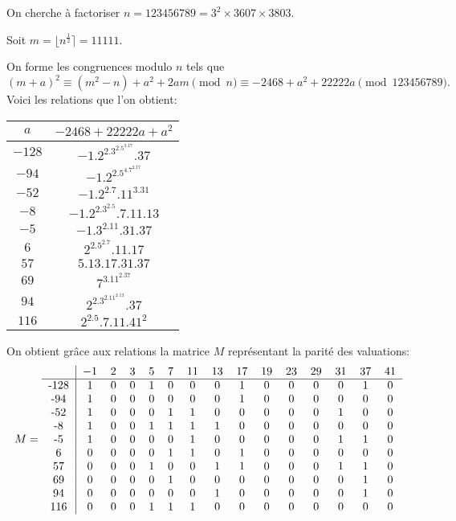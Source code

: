 \documentclass[french, 12pt, titlepage]{article}
\begin{document}
On cherche à factoriser $n = 123456789 = 3^2 \times 3607 \times 3803.$

Soit $ m = \lfloor n^{\frac{1}{2}} \rceil = 11111.$

On forme les congruences modulo $n$ tels que \[  (m + a)^2 \equiv (m^2 - n) + a^2 + 2am \pmod n \equiv  -2468 + a^2 + 22222a \pmod{123456789} .\]
Voici les relations que l'on obtient:

\begin{center}
\begin{tabular}{c|c}
 $a$ & $-2468 + 22222a + a^2$ \\
\hline
 $-128$ & $-1.2^2.3^2.5^3.17.37$ \\
 $-94$ & $-1.2^2.5^4.7^2.17$\\
 $-52$ & $-1.2^2.7.11^3.31$ \\
 $-8$ & $-1.2^2.3^2.5.7.11.13$ \\
 $-5$ & $-1.3^2.11.31.37$\\
 $6$ & $2^2.5^2.7.11.17$\\
$57$ & $5.13.17.31.37 $\\
 $69$ & $7^3.11^2.37$\\
 $94$ & $2^2.3^2.11^2.13.37$\\
 $116$ & $2^2.5.7.11.41^2$\\
\end{tabular}
\end{center}

On obtient grâce aux relations la matrice $M$ représentant la parité des valuations:
\[M = 
  \begin{tabular}{c|cccccccccccccc}
    & $-1$ &  $2$ & $3$ & $5$ & $7$ & $11$ & $13$ & $17$ & $19$ & $23$ & $29$ & $31$ & $37$ & $41$\\
    \hline
    -128 & 1 & 0 & 0 & 1 & 0 & 0 & 0 & 1 & 0 & 0 & 0 & 0 & 1 & 0 \\
    -94 & 1 & 0 & 0 & 0 & 0 & 0 & 0 & 1 & 0 & 0 & 0 & 0 & 0 & 0  \\
    -52 & 1 & 0 & 0 & 0 & 1 & 1 & 0 & 0 & 0 & 0 & 0 & 1 & 0 & 0  \\
    -8 & 1 & 0 & 0 & 1 & 1 & 1 & 1 & 0 & 0 & 0 & 0 & 0 & 0 & 0   \\
    -5 & 1 & 0 & 0 & 0 & 0 & 1 & 0 & 0 & 0 & 0 & 0 & 1 & 1 & 0   \\
    6 & 0 & 0 & 0 & 0 & 1 & 1 & 0 & 1 & 0 & 0 & 0 & 0 & 0 & 0    \\
    57 & 0 & 0 & 0 & 1 & 0 & 0 & 1 & 1 & 0 & 0 & 0 & 1 & 1 & 0   \\
    69 & 0 & 0 & 0 & 0 & 1 & 0 & 0 & 0 & 0 & 0 & 0 & 0 & 1 & 0   \\
    94 & 0 & 0 & 0 & 0 & 0 & 0 & 1 & 0 & 0 & 0 & 0 & 0 & 1 & 0   \\
    116 & 0 & 0 & 0 & 1 & 1 & 1 & 0 & 0 & 0 & 0 & 0 & 0 & 0 & 0  \\
\end{tabular}
  \]
\end{document}
